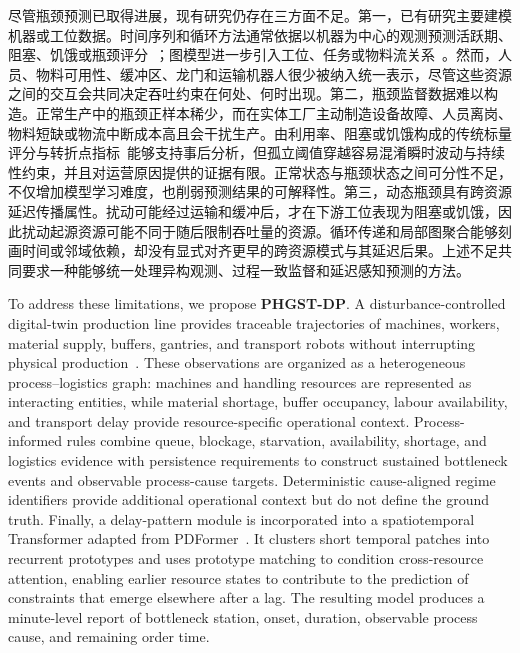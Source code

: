 \documentclass[a4paper,fleqn]{cas-dc}
\newcommand{\zhpara}[1]{%
  \par\begingroup\small\color{black!72}\noindent #1\par\endgroup}
\begin{document}
\zhpara{尽管瓶颈预测已取得进展，现有研究仍存在三方面不足。第一，已有研究主要建模机器或工位数据。时间序列和循环方法通常依据以机器为中心的观测预测活跃期、阻塞、饥饿或瓶颈评分~\cite{li2011throughput,subramaniyan2018data,lai2018twolayer,liu2023lstmdam}；图模型进一步引入工位、任务或物料流关系~\cite{lai2023bstan,yin2025btgcn,ma2023tusb,cen2025dstnn,wu2025knowledge}。然而，人员、物料可用性、缓冲区、龙门和运输机器人很少被纳入统一表示，尽管这些资源之间的交互会共同决定吞吐约束在何处、何时出现。第二，瓶颈监督数据难以构造。正常生产中的瓶颈正样本稀少，而在实体工厂主动制造设备故障、人员离岗、物料短缺或物流中断成本高且会干扰生产。由利用率、阻塞或饥饿构成的传统标量评分与转折点指标~\cite{li2009data,subramaniyan2023throughput,lai2021data,su2022dynamic}能够支持事后分析，但孤立阈值穿越容易混淆瞬时波动与持续性约束，并且对运营原因提供的证据有限。正常状态与瓶颈状态之间可分性不足，不仅增加模型学习难度，也削弱预测结果的可解释性。第三，动态瓶颈具有跨资源延迟传播属性。扰动可能经过运输和缓冲后，才在下游工位表现为阻塞或饥饿，因此扰动起源资源可能不同于随后限制吞吐量的资源。循环传递和局部图聚合能够刻画时间或邻域依赖，却没有显式对齐更早的跨资源模式与其延迟后果。上述不足共同要求一种能够统一处理异构观测、过程一致监督和延迟感知预测的方法。}

To address these limitations, we propose \textbf{PHGST-DP}. A disturbance-controlled digital-twin production line provides traceable trajectories of machines, workers, material supply, buffers, gantries, and transport robots without interrupting physical production~\cite{lu2020digital,isaacsim2026,xue2026safe}. These observations are organized as a heterogeneous process--logistics graph: machines and handling resources are represented as interacting entities, while material shortage, buffer occupancy, labour availability, and transport delay provide resource-specific operational context. Process-informed rules combine queue, blockage, starvation, availability, shortage, and logistics evidence with persistence requirements to construct sustained bottleneck events and observable process-cause targets. Deterministic cause-aligned regime identifiers provide additional operational context but do not define the ground truth. Finally, a delay-pattern module is incorporated into a spatiotemporal Transformer adapted from PDFormer~\cite{jiang2023pdformer}. It clusters short temporal patches into recurrent prototypes and uses prototype matching to condition cross-resource attention, enabling earlier resource states to contribute to the prediction of constraints that emerge elsewhere after a lag. The resulting model produces a minute-level report of bottleneck station, onset, duration, observable process cause, and remaining order time.
\end{document}
